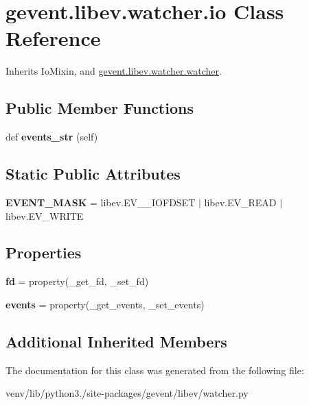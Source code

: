 \hypertarget{classgevent_1_1libev_1_1watcher_1_1io}{}\section{gevent.\+libev.\+watcher.\+io Class Reference}
\label{classgevent_1_1libev_1_1watcher_1_1io}


Inherits Io\+Mixin, and \hyperlink{classgevent_1_1libev_1_1watcher_1_1watcher}{gevent.\+libev.\+watcher.\+watcher}.

\subsection*{Public Member Functions}
\begin{DoxyCompactItemize}
\item 
\mbox{\label{classgevent_1_1libev_1_1watcher_1_1io_aacdc50f356cca68eda243af4aeeea756}} 
def {\bfseries events\+\_\+str} (self)
\end{DoxyCompactItemize}
\subsection*{Static Public Attributes}
\begin{DoxyCompactItemize}
\item 
\mbox{\label{classgevent_1_1libev_1_1watcher_1_1io_aa5bd25bf5b9eaba3ef890d7394c7ed9d}} 
{\bfseries E\+V\+E\+N\+T\+\_\+\+M\+A\+SK} = libev.\+E\+V\+\_\+\+\_\+\+I\+O\+F\+D\+S\+ET $\vert$ libev.\+E\+V\+\_\+\+R\+E\+AD $\vert$ libev.\+E\+V\+\_\+\+W\+R\+I\+TE
\end{DoxyCompactItemize}
\subsection*{Properties}
\begin{DoxyCompactItemize}
\item 
\mbox{\label{classgevent_1_1libev_1_1watcher_1_1io_a1e72036fc09e8e3590c5faf150500c14}} 
{\bfseries fd} = property(\+\_\+get\+\_\+fd, \+\_\+set\+\_\+fd)
\item 
\mbox{\label{classgevent_1_1libev_1_1watcher_1_1io_a34fbec881600700e3079d90748d4a6e8}} 
{\bfseries events} = property(\+\_\+get\+\_\+events, \+\_\+set\+\_\+events)
\end{DoxyCompactItemize}
\subsection*{Additional Inherited Members}


The documentation for this class was generated from the following file\+:\begin{DoxyCompactItemize}
\item 
venv/lib/python3./site-\/packages/gevent/libev/watcher.\+py\end{DoxyCompactItemize}
